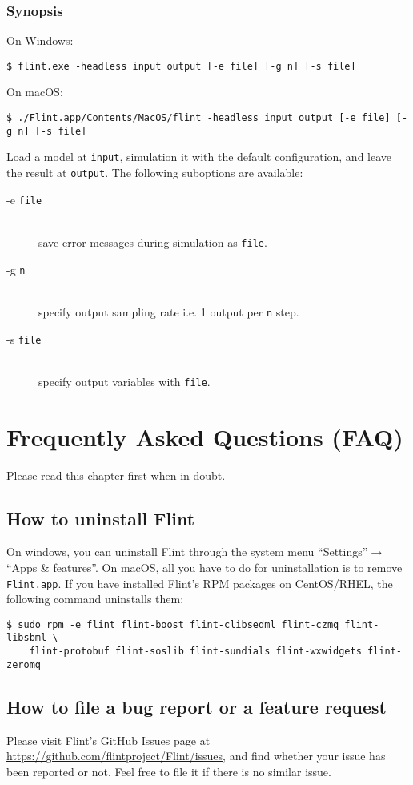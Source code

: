 \documentclass[a4paper,10pt]{report}
\newcommand{\filename}[1]{{\tt #1}}
\begin{document}
\subsection{Synopsis}
On Windows:
\begin{verbatim}
$ flint.exe -headless input output [-e file] [-g n] [-s file]
\end{verbatim}
On macOS:
\begin{verbatim}
$ ./Flint.app/Contents/MacOS/flint -headless input output [-e file] [-g n] [-s file]
\end{verbatim}
Load a model at {\tt input}, simulation it with the default configuration,
and leave the result at {\tt output}.
The following suboptions are available:
\begin{description}
\item[-e {\tt file}] \hfill \\
  save error messages during simulation as {\tt file}.
\item[-g {\tt n}] \hfill \\
  specify output sampling rate i.e. 1 output per {\tt n} step.
\item[-s {\tt file}] \hfill \\
  specify output variables with {\tt file}.
\end{description}


\chapter{Frequently Asked Questions (FAQ)}
Please read this chapter first when in doubt.

\section{How to uninstall Flint}
On windows, you can uninstall Flint through the system menu ``Settings''$\rightarrow$``Apps \& features''.
On macOS, all you have to do for uninstallation is to remove \filename{Flint.app}.
If you have installed Flint's RPM packages on CentOS/RHEL, the following command
uninstalls them:
\begin{verbatim}
$ sudo rpm -e flint flint-boost flint-clibsedml flint-czmq flint-libsbml \
    flint-protobuf flint-soslib flint-sundials flint-wxwidgets flint-zeromq
\end{verbatim}

\section{How to file a bug report or a feature request}
Please visit Flint's GitHub Issues page at
\url{https://github.com/flintproject/Flint/issues},
and find whether your issue has been reported or not.
Feel free to file it if there is no similar issue.
\end{document}

